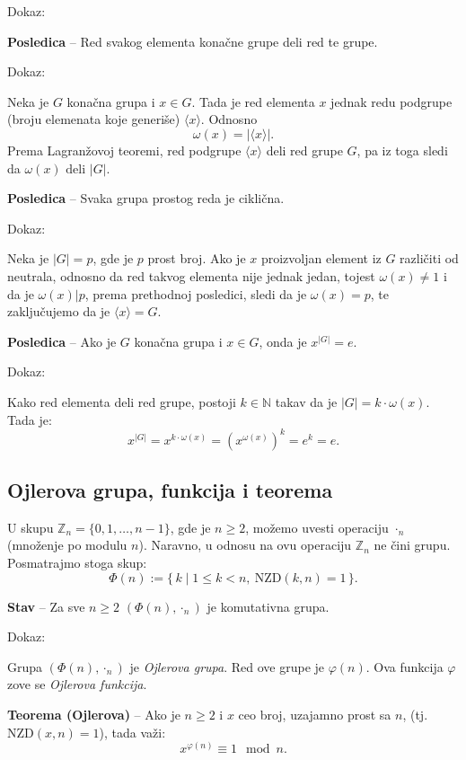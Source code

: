 \documentclass[a4paper,12pt]{article}
\newcommand{\f}[1]{\(#1\)}
\begin{document}
Dokaz:

\medskip
\textbf{Posledica} -- Red svakog elementa konačne grupe deli red te grupe.

Dokaz:

Neka je \f{G} konačna grupa i \f{x \in G}. Tada je red elementa \f{x} jednak redu podgrupe (broju elemenata koje generiše) \f{\langle x \rangle}.
Odnosno \[\omega(x) = |\langle x \rangle|.\] Prema Lagranžovoj teoremi, red podgrupe \f{\langle x \rangle} deli red grupe \f{G}, pa iz toga sledi da \f{\omega(x) \text{ deli } |G|}.

\medskip
\textbf{Posledica} -- Svaka grupa prostog reda je ciklična.

Dokaz:

Neka je \f{|G| = p}, gde je \f{p} prost broj. Ako je \f{x} proizvoljan element iz \f{G} različiti od neutrala,
odnosno da red takvog elementa nije jednak jedan, tojest \f{\omega(x) \neq 1} i da je \f{\omega(x) | p},
prema prethodnoj posledici, sledi da je \f{\omega(x) = p}, te zaključujemo da je \f{\langle x \rangle = G}.

\medskip
\textbf{Posledica} -- Ako je \f{G} konačna grupa i \f{x \in G}, onda je \f{x^{|G|} = e}.

Dokaz:

Kako red elementa deli red grupe, postoji \f{k \in \mathbb{N}} takav da je \f{|G| = k \cdot \omega(x)}. Tada je:
\[
x^{|G|} = x^{k \cdot \omega(x)} = (x^{\omega(x)})^k = e^k = e.
\]

\subsection{Ojlerova grupa, funkcija i teorema}

U skupu $\mathbb{Z}_n = \{0, 1, \dots, n-1\}$, gde je $n \ge 2$,
možemo uvesti operaciju $\cdot_n$ (množenje po modulu $n$).
Naravno, u odnosu na ovu operaciju $\mathbb{Z}_n$ ne čini grupu.
Posmatrajmo stoga skup:
\[
\Phi(n) := \{\, k \mid 1 \le k < n,\ \text{NZD}(k,n)=1 \,\}.
\]
\medskip

\textbf{Stav} -- Za sve $n \geq 2$ $(\Phi(n), \cdot_n)$ je
komutativna grupa.

\medskip
\noindent
Dokaz:

Grupa $(\Phi(n), \cdot_n)$ je \emph{Ojlerova grupa}.
Red ove grupe je $\varphi(n)$.
Ova funkcija $\varphi$ zove se \emph{Ojlerova funkcija}.

 \textbf{Teorema (Ojlerova)} -- Ako je \f{n \geq 2} i \f{x} ceo broj, uzajamno prost sa \f{n}, (tj. \f{\text{NZD}(x, n) = 1}), tada važi:
 \[
 x^{\varphi(n)} \equiv 1 \mod n.
  \]
\end{document}
